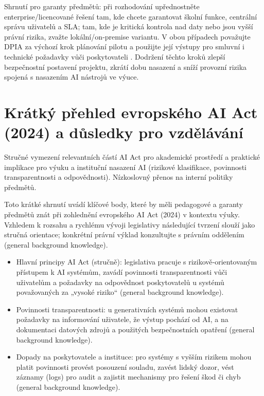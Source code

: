 \documentclass{report}%
\begin{document}
Shrnutí pro garanty předmětů: při rozhodování upřednostněte enterprise/licencované řešení tam, kde chcete garantovat školní funkce, centrální správu uživatelů a SLA; tam, kde je kritická kontrola nad daty nebo jsou vyšší právní rizika, zvažte lokální/on‑premise variantu. V obou případech považujte DPIA za výchozí krok plánování pilotu a použijte její výstupy pro smluvní i technické požadavky vůči poskytovateli \cite{kb_malinka_chatgpt_ve_vyuce_dva_roky_pote_2024_pdf_90bc3aaf_page_12_1, kb_ai_101_tipu_pdf_04e4a115_page_15_2}. Dodržení těchto kroků zlepší bezpečnostní postavení projektu, zkrátí dobu nasazení a sníží provozní rizika spojená s nasazením AI nástrojů ve výuce.%

%
\section{Krátký přehled evropského AI Act (2024) a důsledky pro vzdělávání}%
Stručné vymezení relevantních částí AI Act pro akademické prostředí a praktické implikace pro výuku a instituční nasazení AI (rizikové klasifikace, povinnosti transparentnosti a odpovědnosti). Nízkoslovný přenos na interní politiky předmětů.%


%
Toto krátké shrnutí uvádí klíčové body, které by měli pedagogové a garanty předmětů znát při zohlednění evropského AI Act (2024) v kontextu výuky. Vzhledem k rozsahu a rychlému vývoji legislativy následující tvrzení slouží jako stručná orientace; konkrétní právní výklad konzultujte s právním oddělením (general background knowledge).

\begin{itemize}
  \item Hlavní principy AI Act (stručně): legislativa pracuje s rizikově‑orientovaným přístupem k AI systémům, zavádí povinnosti transparentnosti vůči uživatelům a požadavky na odpovědnost poskytovatelů u systémů považovaných za „vysoké riziko“ (general background knowledge).
  \item Povinnosti transparentnosti: u generativních systémů mohou existovat požadavky na informování uživatele, že výstup pochází od AI, a na dokumentaci datových zdrojů a použitých bezpečnostních opatření (general background knowledge).
  \item Dopady na poskytovatele a instituce: pro systémy s vyšším rizikem mohou platit povinnosti provést posouzení souladu, zavést lidský dozor, vést záznamy (logs) pro audit a zajistit mechanismy pro řešení škod či chyb (general background knowledge).
\end{itemize}
\end{document}
